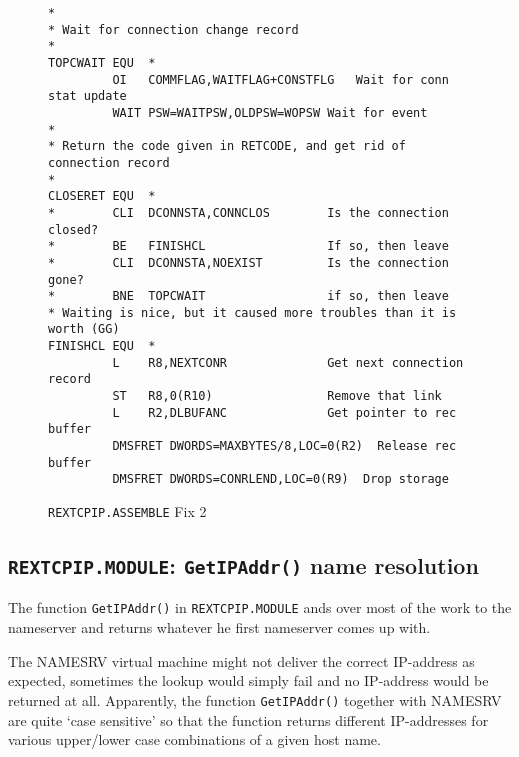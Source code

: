 \begin{figure}
\caption{{\tt REXTCPIP.ASSEMBLE} Fix 2}\label{fix2}
\rule{0mm}{2mm}
\begin{center}
\begin{small}
\begin{verbatim}
*
* Wait for connection change record
*
TOPCWAIT EQU  *
         OI   COMMFLAG,WAITFLAG+CONSTFLG   Wait for conn stat update
         WAIT PSW=WAITPSW,OLDPSW=WOPSW Wait for event
*
* Return the code given in RETCODE, and get rid of connection record
*
CLOSERET EQU  *
*        CLI  DCONNSTA,CONNCLOS        Is the connection closed?
*        BE   FINISHCL                 If so, then leave
*        CLI  DCONNSTA,NOEXIST         Is the connection gone?
*        BNE  TOPCWAIT                 if so, then leave
* Waiting is nice, but it caused more troubles than it is worth (GG)
FINISHCL EQU  *
         L    R8,NEXTCONR              Get next connection record
         ST   R8,0(R10)                Remove that link
         L    R2,DLBUFANC              Get pointer to rec buffer
         DMSFRET DWORDS=MAXBYTES/8,LOC=0(R2)  Release rec buffer
         DMSFRET DWORDS=CONRLEND,LOC=0(R9)  Drop storage
\end{verbatim}
\end{small}
\end{center}
\rule{0mm}{2mm}
\end{figure}



\subsection{{\tt REXTCPIP.MODULE}: {\tt GetIPAddr()} name resolution}
\label{bug.fdns}
 
The function {\tt GetIPAddr()} in {\tt REXTCPIP.MODULE}
ands over most of the work to the nameserver and returns whatever
he first nameserver comes up with.

The NAMESRV virtual machine might not deliver the correct IP-address as
expected, sometimes the lookup would simply fail and no IP-address
would be returned at all.
Apparently, the function {\tt GetIPAddr()} together with NAMESRV are
quite `case sensitive' so that the function returns different
IP-addresses for various upper/lower case combinations of a
given host name.

